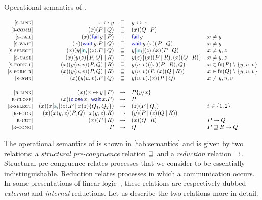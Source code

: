 \begin{table}
    \caption{Operational semantics of \Calculus.}
    \label{tab:semantics}
    \[
        \begin{array}{rrcll}
        \SLink &
        \Link\x\y & \pcong & \Link\y\x \\
        \SComm &
        \Cut\x{P}{Q} & \pcong & \Cut\x{Q}{P} \\
        \SFail &
        \Cut\x{\Fail\y}{P} & \pcong & \Fail\y & x \ne y \\
        \SWait &
        \Cut\x{\Wait\y.P}{Q} & \pcong & \Wait\y.\Cut\x{P}{Q} & x \ne y \\
        \SSelect &
        \Cut\x{\Select\y{\InTag_i}\z.P}{Q} & \pcong & \Select\y{\InTag_i}\z.\Cut\x{P}{Q} & x \ne y,z \\
        \SCase &
        \Cut\x{\Case\y\z{P}{Q}}{R} & \pcong & \Case\y\z{\Cut\x{P}{R}}{\Cut\x{Q}{R}} & x \ne y,z \\
        \SForkL &
        \Cut\x{\Fork\y\u\v{P}{Q}}{R} & \pcong & \Fork\y\u\v{\Cut\x{P}{R}}{Q} & x \in \fn{P}\setminus\set{y,u,v} \\
        \SForkR &
        \Cut\x{\Fork\y\u\v{P}{Q}}{R} & \pcong & \Fork\y\u\v{P}{\Cut\x{Q}{R}} & x \in \fn{Q}\setminus\set{y,u,v} \\
        \SJoin &
        \Cut\x{\Join\y\u\v.P}{Q} & \pcong & \Join\y\u\v.\Cut\x{P}{Q} & x \ne y,u,v \\
        \\
        \RLink &
        \Cut\x{\Link\x\y}{P} & \red & P\subst\y\x \\
        \RClose &
        \Cut\x{\Close\x}{\Wait\x.P} & \red & P \\
        \RSelect &
        \Cut\x{\Select\x{\Tag_i}\z.P}{\Case\x\z{Q_1}{Q_2}} & \red & \Cut\z{P}{Q_i} & i\in\set{1,2} \\
        \RFork &
        \Cut\x{\Fork\x\y\z{P}{Q}}{\Join\x\y\z.R} & \red & \Cut\y{P}{\Cut\z{Q}{R}} \\
        \RCut &
        \Cut\x{P}{R} & \red & \Cut\x{Q}{R} & P \red Q \\
        \RCong &
        P & \red & Q & P \pcong R \red Q \\
        \end{array}
    \]
\end{table}

The operational semantics of \Calculus is shown in \cref{tab:semantics} and is
given by two relations: a \emph{structural pre-congruence} relation $\sqsupseteq$ and
a \emph{reduction} relation $\rightarrow$. Structural pre-congruence relates processes
that we consider to be essentially indistinguishable. Reduction relates
processes in which a communication occurs. In some presentations of linear
logic~\cite{Doumane}, these relations are respectively dubbed \emph{external}
and \emph{internal} reductions. Let us describe the two relations more in
detail.


